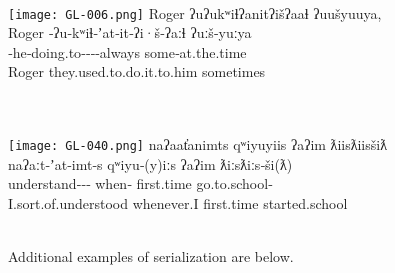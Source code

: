 \begin{exe}
  \ex\label{ex:3.13}
  \begin{xlist}

    \renewcommand{\eachwordfive}{\rule[-10pt]{0pt}{0pt}\rmfamily}

    \ex\label{ex:3.13a}
    \\
    \texttt{[image: GL-006.png]}
    \glllll Roger     ʔuʔukʷiɬʔanitʔišʔaaɬ                                     ʔuušyuuya,\\
            Roger     ‑ʔu‑kʷiɬ‑ʼat‑it‑ʔi·š‑ʔaːɬ                           ʔuːš‑yuːya\\
             ‑he‑doing.to‑‑‑‑always some‑at.the.time\\
            Roger     they.used.to.do.it.to.him                                sometimes\\
                                                              \\

    \ex\label{ex:3.13b}
    \\
    \texttt{[image: GL-040.png]}
    \glllll naʔaat̓animts                            qʷiyuyiis          ʔaʔim      ƛiisƛiisšiƛ\\
            naʔaːt‑ʼat‑imt‑s                         qʷiyu‑(y)iːs        ʔaʔim      ƛiːsƛiːs‑ši(ƛ)\\
            understand‑‑‑ when‑ first.time go.to.school‑\\
            I.sort.of.understood                    whenever.I         first.time started.school\\
                                                       \\

    \renewcommand{\eachwordfive}{\rmfamily}

  \end{xlist}
\end{exe}

\noindent Additional examples of serialization are below.

